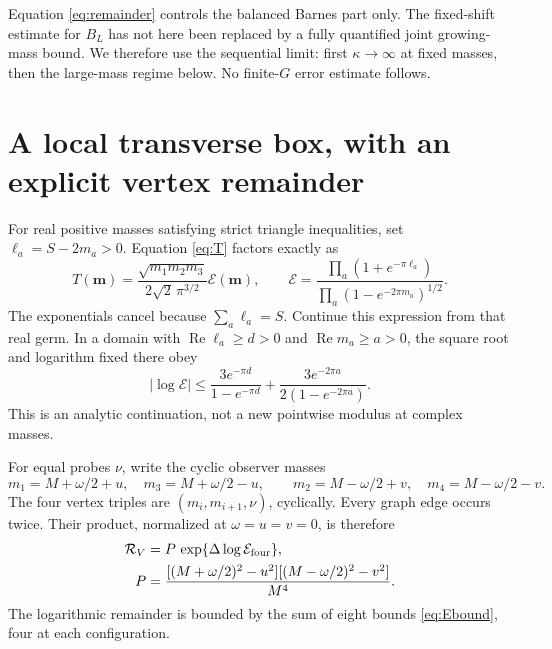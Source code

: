 \documentclass[11pt,a4paper]{article}
\begin{document}
Equation \eqref{eq:remainder} controls the balanced Barnes part only.
The fixed-shift estimate for \(B_L\) has not here been replaced by a
fully quantified joint growing-mass bound. We therefore use the
sequential limit: first \(\kappa\to\infty\) at fixed masses, then the
large-mass regime below. No finite-\(G\) error estimate follows.

\section{A local transverse box, with an explicit vertex remainder}
For real positive masses satisfying strict triangle inequalities, set
\(\ell_a=S-2m_a>0\). Equation \eqref{eq:T} factors exactly as
\begin{equation}
 T(\mathbf m)=\frac{\sqrt{m_1m_2m_3}}{2\sqrt2\,\pi^{3/2}}
 \mathcal E(\mathbf m),\qquad
 \mathcal E=
 \frac{\prod_a(1+e^{-\pi\ell_a})}
      {\prod_a(1-e^{-2\pi m_a})^{1/2}}. \label{eq:E}
\end{equation}
The exponentials cancel because \(\sum_a\ell_a=S\).
Continue this expression from that real germ. In a domain with
\(\operatorname{Re}\ell_a\ge d>0\) and
\(\operatorname{Re}m_a\ge a>0\), the square root and logarithm fixed
there obey
\begin{equation}
 |\log\mathcal E|\le
 \frac{3e^{-\pi d}}{1-e^{-\pi d}}
 +\frac{3e^{-2\pi a}}{2(1-e^{-2\pi a})}. \label{eq:Ebound}
\end{equation}
This is an analytic continuation, not a new pointwise modulus at
complex masses.

For equal probes \(\nu\), write the cyclic observer masses
\[
 m_1=M+\omega/2+u,\quad m_3=M+\omega/2-u,\qquad
 m_2=M-\omega/2+v,\quad m_4=M-\omega/2-v.
\]
The four vertex triples are \((m_i,m_{i+1},\nu)\), cyclically.
Every graph edge occurs twice. Their product, normalized at
\(\omega=u=v=0\), is therefore
\begin{align}
 \mathcal R_V&=P\,\exp\{\Delta\log\mathcal E_{\rm four}\},\\
 P&=\frac{[(M+\omega/2)^2-u^2][(M-\omega/2)^2-v^2]}{M^4}.
 \label{eq:poly}
\end{align}
The logarithmic remainder is bounded by the sum of eight bounds
\eqref{eq:Ebound}, four at each configuration.
\end{document}
